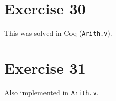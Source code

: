 \section{Exercise 30}

This was solved in Coq ({\tt Arith.v}).

\section{Exercise 31}

Also implemented in {\tt Arith.v}.

